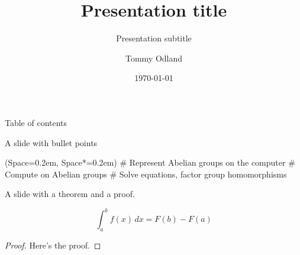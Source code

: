 \documentclass[12pt, aspectratio=149]{beamer}
\title{Presentation title}
\subtitle{Presentation subtitle}
\institute{University of Bergen}
\date{\today}
\author{Tommy Odland}
\newcommand{\listSpace}{0.2em}
\theoremstyle{plain}
\begin{document}
\maketitle
{}
  
\begin{frame}{Table of contents}
	\tableofcontents
\end{frame}

\begin{frame}[fragile]{A slide with bullet points}
	\begin{easylist}[itemize]
		\ListProperties(Space=\listSpace, Space*=\listSpace)
		# Represent Abelian groups on the computer
		# Compute on Abelian groups
		# Solve equations, factor group homomorphisms
	\end{easylist}
\end{frame}

\begin{frame}[fragile]{A slide with a theorem and a proof.}
\begin{theorem}[Integral]
	\begin{equation*}
		\int_{a}^{b} f(x) \, dx = F(b) - F(a)
	\end{equation*}
\end{theorem}
\begin{proof}
Here's the proof.
\end{proof}
\end{frame}
\end{document}
